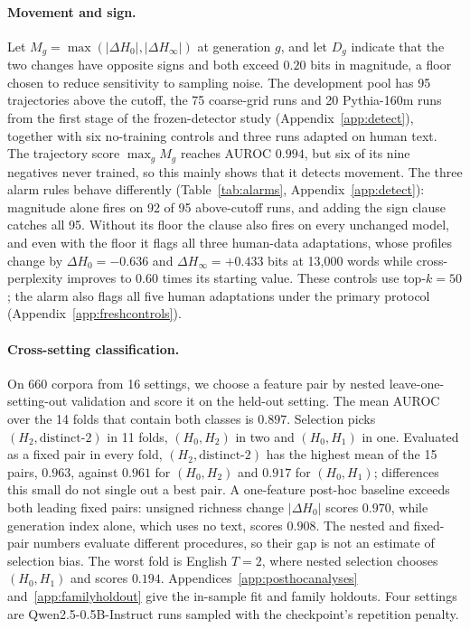 \documentclass[10pt]{article}
\theoremstyle{plain}
\theoremstyle{definition}
\newcommand{\Htwo}{H_2}
\newcommand{\Hz}{H_0}
\newcommand{\Hinf}{H_\infty}
\begin{document}
\paragraph{Movement and sign.} Let $M_g=\max(|\Delta\Hz|,|\Delta\Hinf|)$ at generation $g$,
and let $D_g$ indicate that the two changes have opposite signs and both exceed $0.20$ bits in
magnitude, a floor chosen to reduce sensitivity to sampling noise. The development pool has 95
trajectories above the cutoff, the 75 coarse-grid runs and 20 Pythia-160m runs from the first
stage of the frozen-detector study (Appendix~\ref{app:detect}), together with six no-training
controls and three runs adapted on human text. The trajectory score $\max_g M_g$ reaches AUROC $0.994$, but six of its nine
negatives never trained, so this mainly shows that it detects movement. The three alarm rules behave differently (Table~\ref{tab:alarms}, Appendix~\ref{app:detect}):
magnitude alone fires on 92 of 95 above-cutoff runs, and adding the sign clause catches all 95.
Without its floor the clause also fires on every unchanged model, and even with the floor it flags all
three human-data adaptations, whose profiles change by $\Delta\Hz=-0.636$ and
$\Delta\Hinf=+0.433$ bits at 13,000 words while cross-perplexity improves to $0.60$ times its
starting value. These controls use top-$k=50$; the alarm also flags all five human adaptations
under the primary protocol (Appendix~\ref{app:freshcontrols}).



\paragraph{Cross-setting classification.} On 660 corpora from 16 settings, we choose a feature
pair by nested leave-one-setting-out validation and score it on the held-out setting. The mean
AUROC over the 14 folds that contain both classes is $0.897$. Selection picks
$(\Htwo,\text{distinct-}2)$ in 11 folds, $(\Hz,\Htwo)$ in two and $(\Hz,H_1)$ in one. Evaluated
as a fixed pair in every fold, $(\Htwo,\text{distinct-}2)$ has the highest mean of the 15 pairs,
$0.963$, against $0.961$ for $(\Hz,\Htwo)$ and $0.917$ for $(\Hz,H_1)$; differences this small
do not single out a best pair. A one-feature post-hoc baseline exceeds both leading fixed pairs: unsigned richness change $|\Delta\Hz|$
scores $0.970$, while generation index alone, which uses no text, scores $0.908$.
The nested and fixed-pair numbers evaluate different procedures,
so their gap is not an estimate of selection bias. The worst fold is English $T=2$, where nested
selection chooses $(\Hz,H_1)$ and scores $0.194$. Appendices~\ref{app:posthocanalyses} and~\ref{app:familyholdout} give the in-sample fit and family holdouts. Four settings are
Qwen2.5-0.5B-Instruct runs sampled with the checkpoint's repetition penalty.
\end{document}
